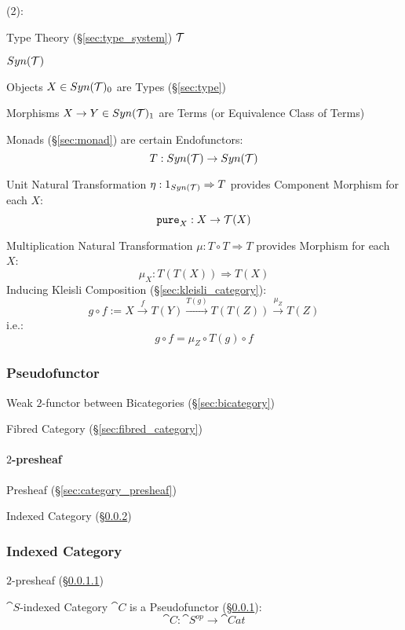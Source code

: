 (2):

Type Theory (\S\ref{sec:type_system}) $\mathcal{T}$

$Syn(\mathcal{T})$

Objects $X \in Syn(\mathcal{T})_0$ are Types (\S\ref{sec:type})

Morphisms $X \rightarrow Y \in Syn(\mathcal{T})_1$ are Terms (or Equivalence
Class of Terms)

Monads (\S\ref{sec:monad}) are certain Endofunctors:
\[
  T : Syn(\mathcal{T}) \rightarrow Syn(\mathcal{T})
\]

Unit Natural Transformation $\eta : 1_{Syn(\mathcal{T})} \Rightarrow T$
provides Component Morphism for each $X$:
\[
  \mathtt{pure}_X : X \rightarrow \mathcal{T}(X)
\]

Multiplication Natural Transformation $\mu : T \circ T \Rightarrow T$
provides Morphism for each $X$:
\[
  \mu_X : T(T(X)) \Rightarrow T(X)
\]
Inducing Kleisli Composition (\S\ref{sec:kleisli_category}):
\[
  g \circ f := X \xrightarrow{f} T(Y) \xrightarrow{T(g)} T(T(Z))
  \xrightarrow{\mu_Z} T(Z)
\]
i.e.:
\[
  g \circ f = \mu_Z \circ T(g) \circ f
\]



\subsubsection{Pseudofunctor}\label{sec:pseudofunctor}

Weak $2$-functor between Bicategories (\S\ref{sec:bicategory})

Fibred Category (\S\ref{sec:fibred_category})



\paragraph{$2$-presheaf}\label{sec:2_presheaf}\hfill

Presheaf (\S\ref{sec:category_presheaf})

Indexed Category (\S\ref{sec:indexed_category})



\subsubsection{Indexed Category}\label{sec:indexed_category}

$2$-presheaf (\S\ref{sec:2_presheaf})

$\cat{S}$-indexed Category $\cat{C}$ is a Pseudofunctor
(\S\ref{sec:pseudofunctor}):
\[
  \cat{C}: \cat{S}^{op} \rightarrow \cat{Cat}
\]

